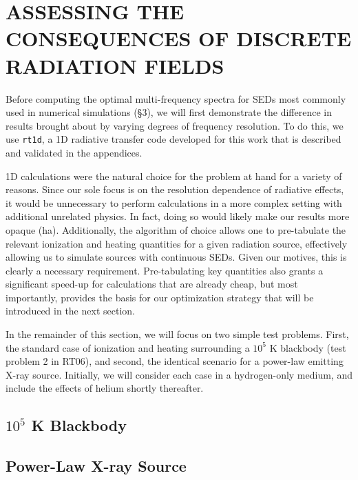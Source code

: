 \documentclass[preprint2]{aastex}              %
\begin{document}

\section{ASSESSING THE CONSEQUENCES OF DISCRETE RADIATION FIELDS}
Before computing the optimal multi-frequency spectra for SEDs most commonly used in numerical simulations (\S3), we will first demonstrate the difference in results brought about by varying degrees of frequency resolution.  To do this, we use \texttt{rt1d}, a 1D radiative transfer code developed for this work that is described and validated in the appendices.  

1D calculations were the natural choice for the problem at hand for a variety of reasons.  Since our sole focus is on the resolution dependence of radiative effects, it would be unnecessary to perform calculations in a more complex setting with additional unrelated physics.  In fact, doing so would likely make our results more opaque (ha).  Additionally, the algorithm of choice allows one to pre-tabulate the relevant ionization and heating quantities for a given radiation source, effectively allowing us to simulate sources with continuous SEDs.  Given our motives, this is clearly a necessary requirement.  Pre-tabulating key quantities also grants a significant speed-up for calculations that are already cheap, but most importantly, provides the basis for our optimization strategy that will be introduced in the next section.

In the remainder of this section, we will focus on two simple test problems.  First, the standard case of ionization and heating surrounding a $10^5$ K blackbody (test problem 2 in RT06), and second, the identical scenario for a power-law emitting X-ray source.  Initially, we will consider each case in a hydrogen-only medium, and include the effects of helium shortly thereafter.

\subsection{$10^5$ K Blackbody}



\subsection{Power-Law X-ray Source}
\end{document}
